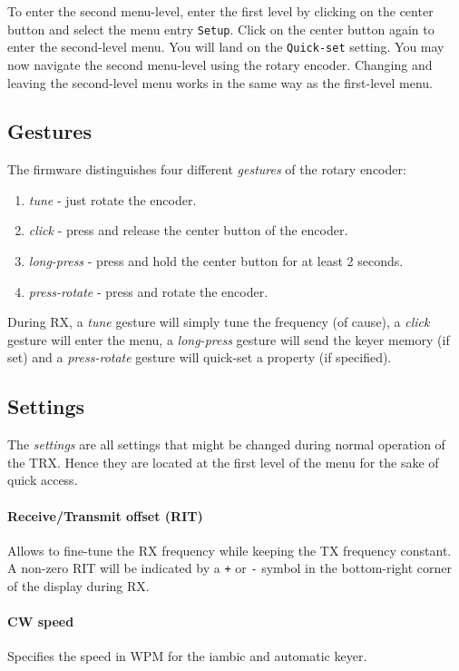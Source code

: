 \documentclass[10pt, a4paper,twoside]{scrartcl}
\begin{document}
To enter the second menu-level, enter the first level by clicking on the center button and select the menu entry \texttt{Setup}. Click on the center button again to enter the second-level menu. You will land on the \texttt{Quick-set} setting. You may now navigate the second menu-level using the rotary encoder. Changing and leaving the second-level menu works in the same way as the first-level menu. 


\subsection{Gestures}
The firmware distinguishes four different \emph{gestures} of the rotary encoder:
\begin{enumerate}
 \item \emph{tune} - just rotate the encoder.
 \item \emph{click} - press and release the center button of the encoder.
 \item \emph{long-press} - press and hold the center button for at least 2 seconds.
 \item \emph{press-rotate} - press and rotate the encoder.
\end{enumerate}

During RX, a \emph{tune} gesture will simply tune the frequency (of cause), a \emph{click} gesture will enter the menu, a \emph{long-press} gesture will send the keyer memory (if set) and a \emph{press-rotate} gesture will quick-set a property (if specified).


\subsection{Settings}
The \emph{settings} are all settings that might be changed during normal operation of the TRX. Hence they are located at the first level of the menu for the sake of quick access.
 
\paragraph{Receive/Transmit offset (RIT)}
Allows to fine-tune the RX frequency while keeping the TX frequency constant. A non-zero RIT will be indicated by a \texttt{+} or \texttt{-} symbol in the bottom-right corner of the display during RX. 

\paragraph{CW speed}
Specifies the speed in WPM for the iambic and automatic keyer.
\end{document}
